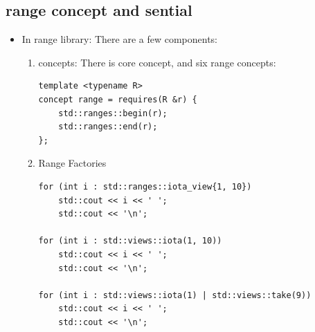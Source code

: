 \documentclass[a4paper,11pt,twoside]{book}
\begin{document}
\subsection{range concept and sential}
\begin{itemize}
\item In range library: There are a few components:
\begin{enumerate}
		\item concepts: There is core concept, and six range concepts:

\begin{lstlisting}
template <typename R>
concept range = requires(R &r) {
    std::ranges::begin(r);
    std::ranges::end(r);
};
\end{lstlisting}

		\item Range Factories 
\begin{lstlisting}
for (int i : std::ranges::iota_view{1, 10})
    std::cout << i << ' ';
    std::cout << '\n';

for (int i : std::views::iota(1, 10))
    std::cout << i << ' ';
    std::cout << '\n';
 
for (int i : std::views::iota(1) | std::views::take(9))
    std::cout << i << ' ';
    std::cout << '\n';
\end{lstlisting}

\end{enumerate}
\end{itemize}
\end{document}
